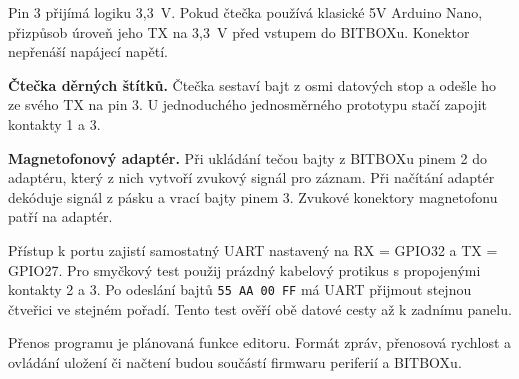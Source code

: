 \documentclass[11pt,a4paper]{article}
\newcommand{\sub}[1]{\par\vspace{2mm}{\sffamily\bfseries\large #1\par}\nobreak}
\newcommand{\note}[1]{\par\vspace{2mm}\noindent\colorbox{pale}{\parbox{.96\linewidth}{\raggedright #1}}\par}
\begin{document}
\note{Pin 3 přijímá logiku 3,3~V. Pokud čtečka používá klasické 5V Arduino Nano, přizpůsob úroveň jeho TX na 3,3~V před vstupem do BITBOXu. Konektor nepřenáší napájecí napětí.}

\sub{Jak port využijí obě periferie}
\textbf{Čtečka děrných štítků.} Čtečka sestaví bajt z osmi datových stop a odešle ho ze svého TX na pin 3. U jednoduchého jednosměrného prototypu stačí zapojit kontakty 1 a 3.

\textbf{Magnetofonový adaptér.} Při ukládání tečou bajty z BITBOXu pinem 2 do adaptéru, který z nich vytvoří zvukový signál pro záznam. Při načítání adaptér dekóduje signál z pásku a vrací bajty pinem 3. Zvukové konektory magnetofonu patří na adaptér.

\sub{První zkouška po doplnění firmwaru}
Přístup k portu zajistí samostatný UART nastavený na RX = GPIO32 a TX = GPIO27. Pro smyčkový test použij prázdný kabelový protikus s propojenými kontakty 2 a 3. Po odeslání bajtů \texttt{55 AA 00 FF} má UART přijmout stejnou čtveřici ve stejném pořadí. Tento test ověří obě datové cesty až k zadnímu panelu.

Přenos programu je plánovaná funkce editoru. Formát zpráv, přenosová rychlost a ovládání uložení či načtení budou součástí firmwaru periferií a BITBOXu.
\end{document}
